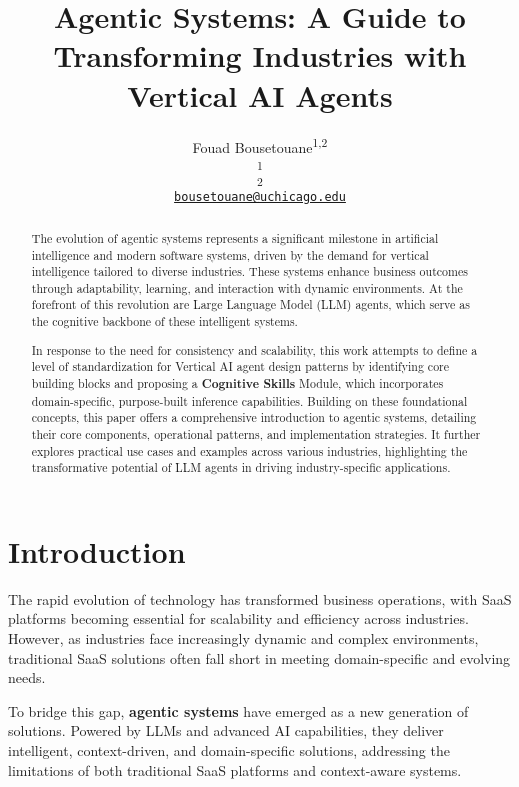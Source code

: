 \documentclass[12pt]{article}
\title{\vspace{-2cm}Agentic Systems: A Guide to Transforming Industries with Vertical AI Agents\vspace{1cm}}
\author{
    Fouad Bousetouane\textsuperscript{1,2} \\[1em] %
    \textsuperscript{1}\text{The University of Chicago, USA} \\[0.75em] %
    \textsuperscript{2}\text{2ndsight.ai} \\[1.5em] %
    {\small \href{mailto:bousetouane@uchicago.edu}{\texttt{bousetouane@uchicago.edu}}}
}
\date{}
\begin{document}
\maketitle

\begin{abstract}
The evolution of agentic systems represents a significant milestone in artificial intelligence and modern software systems, driven by the demand for vertical intelligence tailored to diverse industries. These systems enhance business outcomes through adaptability, learning, and interaction with dynamic environments. At the forefront of this revolution are Large Language Model (LLM) agents, which serve as the cognitive backbone of these intelligent systems. 

In response to the need for consistency and scalability, this work attempts to define a level of standardization for Vertical AI agent design patterns by identifying core building blocks and proposing a \textbf{Cognitive Skills } Module, which incorporates domain-specific, purpose-built inference capabilities. Building on these foundational concepts, this paper offers a comprehensive introduction to agentic systems, detailing their core components, operational patterns, and implementation strategies. It further explores practical use cases and examples across various industries, highlighting the transformative potential of LLM agents in driving industry-specific applications.
\end{abstract}


\newpage
\tableofcontents
\newpage

\section{Introduction}
The rapid evolution of technology has transformed business operations, with SaaS platforms \cite{AIforITOps2023} becoming essential for scalability and efficiency across industries. However, as industries face increasingly dynamic and complex environments, traditional SaaS solutions often fall short in meeting domain-specific and evolving needs.

To bridge this gap, \textbf{agentic systems} have emerged as a new generation of solutions. Powered by LLMs and advanced AI capabilities, they deliver intelligent, context-driven, and domain-specific solutions, addressing the limitations of both traditional SaaS platforms and context-aware systems.
\end{document}
